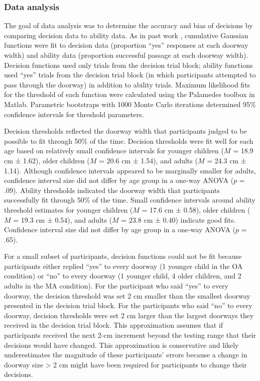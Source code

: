 \documentclass[a4paper,man,natbib,floatsintext,noextraspace]{apa6}
\begin{document}
\subsubsection{Data analysis}

The goal of data analysis was to determine the accuracy and bias of decisions by comparing decision data to ability data. As in past work \citep{Recal,PregAps}, cumulative Gaussian functions were fit to decision data (proportion “yes” responses at each doorway width) and ability data (proportion successful passage at each doorway width). Decision functions used only trials from the decision trial block; ability functions used “yes” trials from the decision trial block (in which participants attempted to pass through the doorway) in addition to ability trials. Maximum likelihood fits for the threshold of each function were calculated using the Palamedes toolbox \citep{KingdomPrins} in Matlab. Parametric bootstraps with 1000 Monte Carlo iterations determined 95\% confidence intervals for threshold parameters. 

Decision thresholds reflected the doorway width that participants judged to be possible to fit through 50\% of the time. Decision thresholds were fit well for each age based on relatively small confidence intervals for younger children ($M$ = 18.9 cm ± 1.62), older children ($M$ = 20.6 cm ± 1.54), and adults ($M$ = 24.3 cm ± 1.14). Although confidence intervals appeared to be marginally smaller for adults, confidence interval size did not differ by age group in a one-way ANOVA ($p$ = .09). Ability thresholds indicated the doorway width that participants successfully fit through 50\% of the time. Small confidence intervals around ability threshold estimates for younger children ($M$ = 17.6 cm ± 0.58), older children ($M$ = 19.3 cm ± 0.54), and adults ($M$ = 23.8 cm ± 0.40) indicate good fits. Confidence interval size did not differ by age group in a one-way ANOVA ($p$ = .65).

For a small subset of participants, decision functions could not be fit because participants either replied “yes” to every doorway (1 younger child in the OA condition) or “no” to every doorway (1 younger child, 4 older children, and 2 adults in the MA condition). For the participant who said “yes” to every doorway, the decision threshold was set 2 cm smaller than the smallest doorway presented in the decision trial block. For the participants who said “no” to every doorway, decision thresholds were set 2 cm larger than the largest doorways they received in the decision trial block. This approximation assumes that if participants received the next 2-cm increment beyond the testing range that their decisions would have changed. This approximation is conservative and likely underestimates the magnitude of these participants’ errors because a change in doorway size > 2 cm might have been required for participants to change their decisions. 
\end{document}
